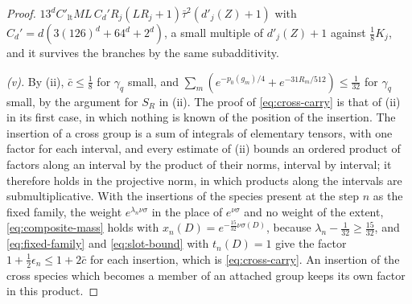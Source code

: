\documentclass[11pt]{preprint}
\numberwithin{equation}{section}
\theoremstyle{definition}
\theoremstyle{remark}
\theoremstyle{plain}
\begin{document}
\begin{proof}
$13^dC'_{\mathrm{lt}}ML\,C_d'R_j(LR_j + 1)\bar\tau^2(d'_j(Z) + 1)$ with $C_d' = d(3(126)^d + 64^d + 2^d)$, a small multiple of $d'_j(Z) + 1$ against $\frac18K_j$, and it survives the branches by the same subadditivity.

\emph{(v).} By (ii), $\bar c \leq \frac18$ for $\gamma_q$ small, and $\sum_m(e^{-p_0(g_m)/4} + e^{-31R_m/512}) \leq \frac{1}{32}$ for $\gamma_q$ small, by the argument for $S_R$ in (ii). The proof of \eqref{eq:cross-carry} is that of (ii) in its first case, in which nothing is known of the position of the insertion. The insertion of a cross group is a sum of integrals of elementary tensors, with one factor for each interval, and every estimate of (ii) bounds an ordered product of factors along an interval by the product of their norms, interval by interval; it therefore holds in the projective norm, in which products along the intervals are submultiplicative. With the insertions of the species present at the step $n$ as the fixed family, the weight $e^{\lambda_n\nu\sigma}$ in the place of $e^{\nu\sigma}$ and no weight of the extent, \eqref{eq:composite-mass} holds with $x_n(D) = e^{-\frac{15}{32}\nu\sigma(D)}$, because $\lambda_n - \frac{1}{32} \geq \frac{15}{32}$, and \eqref{eq:fixed-family} and \eqref{eq:slot-bound} with $t_n(D) = 1$ give the factor $1 + \frac12\epsilon_n \leq 1 + 2\bar c$ for each insertion, which is \eqref{eq:cross-carry}. An insertion of the cross species which becomes a member of an attached group keeps its own factor in this product.


\end{proof}
\end{document}
